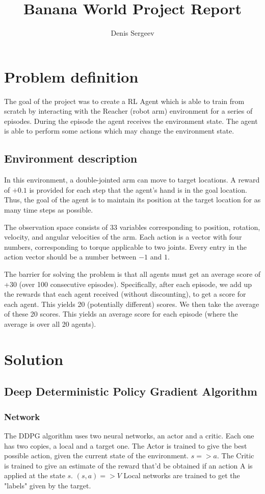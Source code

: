 \documentclass{report}
\begin{document}
\title{Banana World Project Report}
\author{Denis Sergeev}


\section*{Problem definition}

The goal of the project was to create a RL Agent which is able to train from scratch by interacting with the Reacher (robot arm) environment for a series of episodes. During the episode the agent receives the environment state. The agent is able to perform some actions which may change the environment state.

\subsection*{Environment description}

In this environment, a double-jointed arm can move to target locations. A reward of \(+0.1\) is provided for each step that the agent's hand is in the goal location. Thus, the goal of the agent is to maintain its position at the target location for as many time steps as possible.

The observation space consists of 33 variables corresponding to position, rotation, velocity, and angular velocities of the arm. Each action is a vector with four numbers, corresponding to torque applicable to two joints. Every entry in the action vector should be a number between \(-1\) and \(1\).

The barrier for solving the problem is that all agents must get an average score of +30 (over 100 consecutive episodes). Specifically, after each episode, we add up the rewards that each agent received (without discounting), to get a score for each agent. This yields 20 (potentially different) scores. We then take the average of these 20 scores. This yields an average score for each episode (where the average is over all 20 agents).


\section*{Solution}
\subsection*{Deep Deterministic Policy Gradient Algorithm}
\subsubsection*{Network}
The DDPG algorithm uses two neural networks, an actor and a critic. Each one has two copies, a local and a target one. The Actor is trained to give the best possible action, given the current state of the environment. \(s => a\). The Critic is trained to give an estimate of the reward that'd be obtained if an action A is applied at the state \(s\). \((s, a) => V\) Local networks are trained to get the "labels" given by the target.
\end{document}
